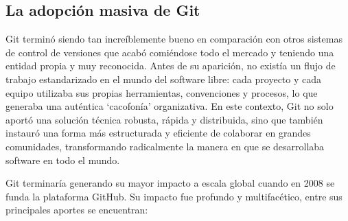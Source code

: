 \documentclass[a4paper,12pt]{article}
\begin{document}
\subsection{La adopción masiva de Git}

Git terminó siendo tan increíblemente bueno en comparación con otros sistemas de
control de versiones que acabó comiéndose todo el mercado y teniendo una entidad
propia y muy reconocida. Antes de su aparición, no existía un flujo de trabajo
estandarizado en el mundo del software libre: cada proyecto y cada equipo
utilizaba sus propias herramientas, convenciones y procesos, lo que generaba una
auténtica `cacofonía' organizativa. En este contexto, Git no solo aportó una
solución técnica robusta, rápida y distribuida, sino que también instauró una
forma más estructurada y eficiente de colaborar en grandes comunidades,
transformando radicalmente la manera en que se desarrollaba software en todo el
mundo.

Git terminaría generando su mayor impacto a escala global cuando en 2008 se
funda la plataforma GitHub. Su impacto fue profundo y multifacético, entre sus
principales aportes se encuentran:
\end{document}
